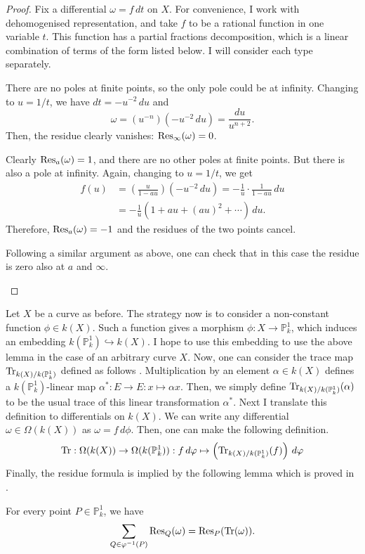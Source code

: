 \begin{proof}
  Fix a differential $\omega=f\,dt$ on $X$. For convenience, I work with
  dehomogenised representation, and take $f$ to be a rational function
  in one variable $t$. This function has a partial fractions decomposition,
  which is a linear combination of terms of the form listed below. I will
  consider each type separately.
  \begin{description}[style=nextline]
    \item[Term of type $\omega=t^{n}\,dt$:] There are no poles at finite
          points, so the only pole could be at infinity. Changing to
          $u=1/t$, we have $dt=-u^{-2}\,du$ and
          \[\omega=(u^{-n})(-u^{-2}\,du)=\frac{du}{u^{n+2}}.\]
          Then, the residue clearly vanishes: $\operatorname{Res}_{\infty}(\omega)=0$.
    \item[Term of type $\omega=\frac{dt}{t-a}$:] Clearly $\operatorname{Res}_{a}(\omega)=1$,
          and there are no other poles at finite points. But there is also a
          pole at infinity. Again, changing to $u=1/t$, we get
          \begin{align*}
            f(u)&=\left(\frac{u}{1-au}\right)(-u^{-2}\,du)
            =-\frac1{u}\cdot\frac1{1-au}\,du \\
            &=-\frac1{u}\left(1+au+(au)^{2}+\cdots\right)\,du.
          \end{align*}
          Therefore, $\operatorname{Res}_{a}(\omega)=-1$ and the residues of the two points
          cancel.
    \item[Term of type $\omega=\frac{dt}{(t-a)^{n}}$ for $n>1$:] Following
          a similar argument as above, one can check that in this case
          the residue is zero also at $a$ and $\infty$.
  \end{description}
\end{proof}
Let $X$ be a curve as before. The strategy now is to consider a non-constant
function $\phi\in k(X)$. Such a function gives a morphism
$\phi:X\to\mathbb{P}^{1}_{k}$, which induces an embedding
$k(\mathbb{P}^{1}_{k})\hookrightarrow k(X)$. I hope to use this embedding
to use the above lemma in the case of an arbitrary curve $X$.
Now, one can consider the trace map $\operatorname{Tr}_{k(X)/k(\mathbb{P}^{1}_{k})}$ defined
as follows \cite{milne}. Multiplication by an element $\alpha\in k(X)$
defines a $k(\mathbb{P}^{1}_{k})$-linear map
$\alpha^{\ast}: E\to E: x\mapsto \alpha x$. Then, we simply define
$\operatorname{Tr}_{k(X)/k(\mathbb{P}^{1}_{k})}(\alpha)$ to be the usual trace of this linear
transformation $\alpha^{\ast}$. Next I translate this definition to
differentials on $k(X)$. We can write any differential
$\omega\in\Omega(k(X))$ as $\omega=f\,d\phi$. Then, one can make the
following definition.
\[
  \operatorname{Tr}:\Omega(k(X))\to \Omega(k(\mathbb{P}^{1}_{k}))
  :f\,d\varphi\mapsto \left(\operatorname{Tr}_{k(X)/k(\mathbb{P}^{1}_{k})}(f)\right)\,d\varphi
\]
Finally, the residue formula is implied by the following lemma which
is proved in \cite{serre}.
\begin{lemm}
  For every point $P\in\mathbb{P}^{1}_{k}$, we have
  \[
    \sum_{Q\in\varphi^{-1}(P)}\operatorname{Res}_{Q}(\omega)=\operatorname{Res}_{P}(\operatorname{Tr}(\omega)).
  \]
\end{lemm}

